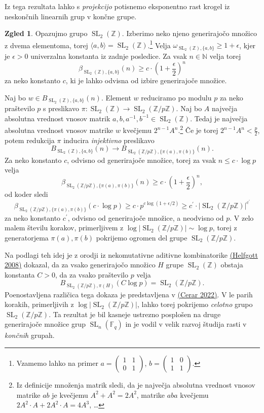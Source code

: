 \documentclass[11pt]{book}
\def\NN{\mathbb{N}}
\def\ZZ{\mathbb{Z}}
\def\field{\mathbb{F}}
\DeclareMathOperator\SL{SL}
\theoremstyle{definition}
\theoremstyle{zgled}
\newtheorem*{zgled}{Zgled}
\theoremstyle{odprtproblem}
\theoremstyle{domacanaloga}
\theoremstyle{izrek}
\begin{document}
Iz tega rezultata lahko s {\em projekcijo} potisnemo eksponentno rast krogel iz neskončnih linearnih grup v končne grupe. 

\begin{zgled}
Opazujmo grupo $\SL_2(\ZZ)$. Izberimo neko njeno generirajočo množico z dvema elementoma, torej $\langle a,b \rangle = \SL_2(\ZZ)$.\footnote{Vzamemo lahko na primer $a = \left( \begin{smallmatrix} 1 & 1 \\ 0 & 1 \end{smallmatrix} \right)$, $b = \left( \begin{smallmatrix} 1 & 0 \\ 1 & 1 \end{smallmatrix} \right)$.} Velja $\omega_{\SL_2(\ZZ), \{a,b\}} \geq 1 + \epsilon$, kjer je $\epsilon > 0$ univerzalna konstanta iz zadnje posledice. Za vsak $n \in \NN$ velja torej
\[
\beta_{\SL_2(\ZZ), \{ a, b \}}(n) \geq c \cdot \left( 1 + \frac{\epsilon}{2} \right)^n
\]
za neko konstanto $c$, ki je lahko odvisna od izbire generirajoče množice.

Naj bo $w \in B_{\SL_2(\ZZ), \{ a, b \}}(n)$. Element $w$ reduciramo po modulu $p$ za neko praštevilo $p$ s preslikavo $\pi \colon \SL_2(\ZZ) \to \SL_2(\ZZ/p\ZZ)$. Naj bo $A$ največja absolutna vrednost vnosov matrik $a,b,a^{-1},b^{-1} \in \SL_2(\ZZ)$. Tedaj je največja absolutna vrednost vnosov matrike $w$ kvečjemu $2^{n-1} A^n$.\footnote{Iz definicije množenja matrik sledi, da je največja absolutna vrednost vnosov matrike $ab$ je kvečjemu $A^2 + A^2 = 2 A^2$, matrike $aba$ kvečjemu $2A^2 \cdot A + 2A^2 \cdot A = 4 A^3$, \dots} Če je torej $2^{n-1} A^n < \frac{p}{2}$, potem redukcija $\pi$ inducira {\em injektivno} preslikavo
\[
B_{\SL_2(\ZZ), \{a,b\}}(n) \to B_{\SL_2(\ZZ/p\ZZ), \{ \pi(a),\pi(b) \}}(n).
\]
Za neko konstanto $c$, odvisno od generirajoče množice, torej za vsak $n \leq c \cdot \log p$ velja
\[
\beta_{\SL_2(\ZZ/p\ZZ), \{ \pi(a), \pi(b) \}}(n) \geq c \cdot \left( 1 + \frac{\epsilon}{2} \right)^n,
\]
od koder sledi
\[
\beta_{\SL_2(\ZZ/p\ZZ), \{ \pi(a), \pi(b) \}}(c \cdot \log p) \geq c \cdot p^{c \log (1 + \epsilon/2)} \geq c^{\prime} \cdot |\SL_2(\ZZ/p\ZZ)|^{c^{\prime}}
\]
za neko konstanto $c^\prime$, odvisno od generirajoče množice, a neodvisno od $p$. V zelo malem številu korakov, primerljivem z $\log |\SL_2(\ZZ/p\ZZ)| \sim \log p$, torej z generatorjema $\pi(a), \pi(b)$ pokrijemo ogromen del grupe $\SL_2(\ZZ/p\ZZ)$.

Na podlagi teh idej je z orodji iz nekomutativne aditivne kombinatorike \href{https://annals.math.princeton.edu/2008/167-2/p06}{(Helfgott 2008)} dokazal, da za vsako generirajočo množico $H$ grupe $\SL_2(\ZZ)$ obstaja konstanta $C > 0$, da za vsako praštevilo $p$ velja 
\[
B_{\SL_2(\ZZ/p\ZZ), \pi(H)}(C \log p) = \SL_2(\ZZ/p\ZZ).
\]
Poenostavljena različica tega dokaza je predstavljena v \href{https://repozitorij.uni-lj.si/IzpisGradiva.php?id=140815&lang=eng}{(Cerar 2022)}.
V le parih korakih, primerljivih z $\log |\SL_2(\ZZ/p\ZZ)|$, lahko torej pokrijemo {\em celotno} grupo $\SL_2(\ZZ/p\ZZ)$. Ta rezultat je bil kasneje ustrezno posplošen na druge generirajoče množice grup $\SL_n(\field_q)$ in je vodil v velik razvoj študija rasti v {\em končnih} grupah.
\end{zgled}
\end{document}
